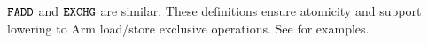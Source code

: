 
$\texttt{FADD}$ and $\texttt{EXCHG}$ are similar.  These definitions ensure atomicity and
support lowering to Arm load/store exclusive operations.  See
\citet{DBLP:journals/pacmpl/JagadeesanJR20} for examples.

